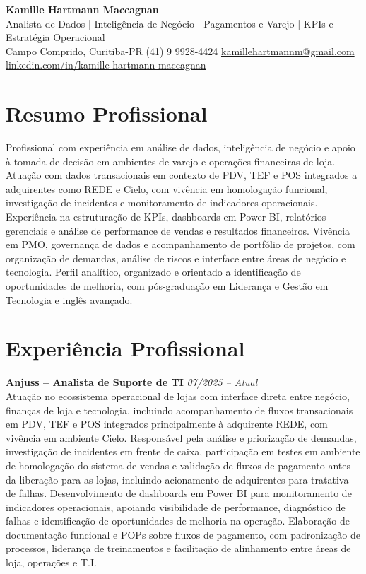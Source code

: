 \documentclass[11pt,a4paper]{article}
\newcommand{\cvheader}[4]{%
  \begin{center}
    {\LARGE\bfseries #1}\\[4pt]
    {\large #2}\\[6pt]
    #3\\[2pt]
    #4
  \end{center}
  \vspace{4pt}
}
\newcommand{\experience}[3]{%
  \textbf{#1} \hfill \textit{#2}\\[4pt]
  #3
  \vspace{8pt}
}
\begin{document}
\cvheader{Kamille Hartmann Maccagnan}%
{Analista de Dados | Inteligência de Negócio | Pagamentos e Varejo | KPIs e Estratégia Operacional}%
{Campo Comprido, Curitiba-PR \textbullet{} (41) 9 9928-4424 \textbullet{} \href{mailto:kamillehartmannm@gmail.com}{kamillehartmannm@gmail.com}}%
{\href{https://linkedin.com/in/kamille-hartmann-maccagnan/}{linkedin.com/in/kamille-hartmann-maccagnan}}

\section*{Resumo Profissional}

Profissional com experiência em análise de dados, inteligência de negócio e apoio à tomada de decisão em ambientes de varejo e operações financeiras de loja. Atuação com dados transacionais em contexto de PDV, TEF e POS integrados a adquirentes como REDE e Cielo, com vivência em homologação funcional, investigação de incidentes e monitoramento de indicadores operacionais. Experiência na estruturação de KPIs, dashboards em Power BI, relatórios gerenciais e análise de performance de vendas e resultados financeiros. Vivência em PMO, governança de dados e acompanhamento de portfólio de projetos, com organização de demandas, análise de riscos e interface entre áreas de negócio e tecnologia. Perfil analítico, organizado e orientado a identificação de oportunidades de melhoria, com pós-graduação em Liderança e Gestão em Tecnologia e inglês avançado.

\section*{Experiência Profissional}

\experience{Anjuss -- Analista de Suporte de TI}{07/2025 -- Atual}{%
Atuação no ecossistema operacional de lojas com interface direta entre negócio, finanças de loja e tecnologia, incluindo acompanhamento de fluxos transacionais em PDV, TEF e POS integrados principalmente à adquirente REDE, com vivência em ambiente Cielo. Responsável pela análise e priorização de demandas, investigação de incidentes em frente de caixa, participação em testes em ambiente de homologação do sistema de vendas e validação de fluxos de pagamento antes da liberação para as lojas, incluindo acionamento de adquirentes para tratativa de falhas. Desenvolvimento de dashboards em Power BI para monitoramento de indicadores operacionais, apoiando visibilidade de performance, diagnóstico de falhas e identificação de oportunidades de melhoria na operação. Elaboração de documentação funcional e POPs sobre fluxos de pagamento, com padronização de processos, liderança de treinamentos e facilitação de alinhamento entre áreas de loja, operações e T.I.}
\end{document}
